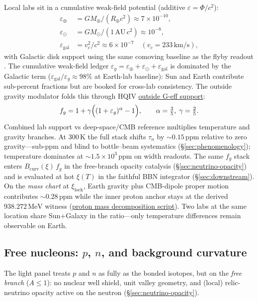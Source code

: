 \documentclass[11pt,notitlepage]{amsart}
\begin{document}
Local labs sit in a cumulative weak-field potential (additive $\varepsilon=\Phi/c^2$):
\begin{align*}
  \varepsilon_\oplus &= GM_\oplus/(R_\oplus c^2) \approx 7\times 10^{-10},\\
  \varepsilon_\odot &= GM_\odot/(1\,\mathrm{AU}\,c^2) \approx 10^{-8},\\
  \varepsilon_{\mathrm{gal}} &= v_c^2/c^2 \approx 6\times 10^{-7}\quad
    (v_c=233\,\mathrm{km/s}),
\end{align*}
with Galactic disk support using the same comoving baseline as the flyby readout
\cite{hqiv-flyby-paper}. The cumulative weak-field ledger
$\varepsilon_g=\varepsilon_\oplus+\varepsilon_\odot+\varepsilon_{\mathrm{gal}}$ is
dominated by the Galactic term ($\varepsilon_{\mathrm{gal}}/\varepsilon_g\approx 98\%$ at
Earth-lab baseline): Sun and Earth contribute sub-percent fractions but are booked for
cross-lab consistency. The outside gravity modulator folds this through HQIV
\hyperref[lean:geff-outside]{outside G-eff support}:
\[
  f_g = 1 + \gamma\Bigl((1+\varepsilon_g)^{\alpha}-1\Bigr),
  \qquad \alpha=\tfrac{3}{5},\;\gamma=\tfrac{2}{5}.
\]
Combined lab support vs deep-space/CMB reference multiplies temperature and gravity
branches. At $300\,\mathrm{K}$ the full stack shifts $\tau_n$ by $\sim 0.15\,\mathrm{ppm}$
relative to zero gravity---sub-ppm and blind to bottle--beam systematics
(\S\ref{sec:phenomenology}); temperature dominates at $\sim 1.5\times 10^3\,\mathrm{ppm}$ on
width readouts. The same $f_g$ stack enters $B_{\mathrm{curv}}(\xi)\,f_g$ in the
free-branch opacity catalysis (\S\ref{sec:neutrino-opacity}) and is evaluated at hot
$\xi(T)$ in the faithful BBN integrator (\S\ref{sec:downstream}). On the \emph{mass chart} at $\xi_{\mathrm{lock}}$, Earth gravity plus
CMB-dipole proper motion contributes $\sim 0.28\,\mathrm{ppm}$ while the inner proton
anchor stays at the derived $938.272\,\mathrm{MeV}$ witness
(\hyperref[app:scripts]{proton mass decomposition script}). Two labs
at the same location share Sun+Galaxy in the ratio---only temperature differences remain
observable on Earth.

\subsection{Free nucleons: $p$, $n$, and background curvature}
\label{sec:free-nucleons-curvature}

The light panel treats $p$ and $n$ as fully as the bonded isotopes, but on the
\emph{free branch} ($A\le 1$): no nuclear well shield, unit valley geometry, and
(local) relic-neutrino opacity active on the neutron (\S\ref{sec:neutrino-opacity}).
\end{document}

